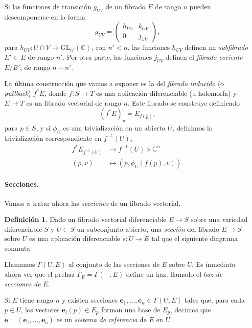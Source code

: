 \documentclass[12pt,a4paper]{article}
\theoremstyle{definition} \newtheorem{defn}[thm]{Definición}
\theoremstyle{definition} \newtheorem{ejemplo}[thm]{Ejemplo}
\theoremstyle{definition} \newtheorem{ejercicio}[thm]{Ejercicio}
\def\CC{\mathbb{C}}
\def\GL{\mathrm{GL}}
\begin{document}
	    Si las funciones de transición $g_{UV}$ de un fibrado $E$ de rango $n$ pueden descomponerse en la forma
	    \begin{equation*}
	      g_{UV} = 
	      \left(
		\begin{array}{c|c}
		  h_{UV} & k_{UV} \\
		  \hline
		  0 & j_{UV}
		\end{array}
		 \right),
	    \end{equation*}
	    para $h_{UV}:U\cap V \rightarrow \GL_{n'}(\CC)$, con $n'<n$, las funciones $h_{UV}$ definen un \emph{subfibrado} $E'\subset E$ de rango $n'$. Por otra parte, las funciones $j_{UV}$ definen el \emph{fibrado cociente} $E/E'$, de rango $n-n'$.

	    La última construcción que vamos a exponer es la del \emph{fibrado inducido} (o \emph{pullback}) $f^*E$, donde $f:S\rightarrow T$ es una aplicación diferenciable (u holomorfa) y $E\rightarrow T$ es un fibrado vectorial de rango $n$. Este fibrado se construye definiendo
	    \begin{equation*}
	      (f^* E)_p = E_{f(p)},
	    \end{equation*}
	    para $p\in S$, y si $\phi_U$ es una trivialización en un abierto $U$, definimos la trivialización correspondiente en $f^{-1}(U)$,
	    \begin{align*}
	      f^*E_{f^{-1}(U)}&\longrightarrow f^{-1}(U) \times \CC^n\\ 
	        (p,v) &\longmapsto (p, \phi_U(f(p),v)). 
	      \end{align*}

	      \paragraph{Secciones.} Vamos a tratar ahora las \emph{secciones} de un fibrado vectorial.
	      \begin{defn}
		Dado un fibrado vectorial diferenciable $E\rightarrow S$ sobre una variedad diferenciable $S$ y $U\subset S$ un subconjunto abierto, una \emph{sección} del fibrado $E\rightarrow S$ sobre $U$ es una aplicación diferenciable $s: U \rightarrow E$ tal que el siguiente diagrama conmuta
		\begin{center}
		\end{center}
		Llamamos $\Gamma(U,E)$ al conjunto de las secciones de $E$ sobre $U$. Es inmediato ahora ver que el prehaz $\Gamma_E = \Gamma(-,E)$ define un haz, llamado el \emph{haz de secciones de $E$}.

		Si $E$ tiene rango $n$ y existen secciones $\mathbf{e}_1,\dots,\mathbf{e}_n \in \Gamma(U,E)$ tales que, para cada $p\in U$, los vectores $\mathbf{e}_i(p) \in E_p$ forman una base de $E_p$, decimos que $\mathbf{e}=(\mathbf{e}_1,\dots,\mathbf{e}_n)$ es un \emph{sistema de referencia} de $E$ en $U$.
	      \end{defn}
\end{document}

